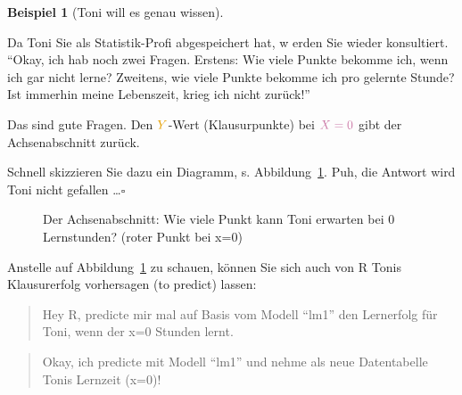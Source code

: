 \documentclass[
  letterpaper,
]{scrbook}
\theoremstyle{definition}
\newtheorem{example}{Beispiel}[chapter]
\theoremstyle{definition}
\theoremstyle{definition}
\theoremstyle{remark}
\begin{document}
\begin{example}[Toni will es genau
wissen]\protect\hypertarget{exm-noten5}{}\label{exm-noten5}

Da Toni Sie als Statistik-Profi abgespeichert hat, w erden Sie wieder
konsultiert. ``Okay, ich hab noch zwei Fragen. Erstens: Wie viele Punkte
bekomme ich, wenn ich gar nicht lerne? Zweitens, wie viele Punkte
bekomme ich pro gelernte Stunde? Ist immerhin meine Lebenszeit, krieg
ich nicht zurück!''

{Das sind gute Fragen. Den \(\color{ycol}{Y}\)-Wert (Klausurpunkte) bei
\(\color{xcol}{X}=0\) gibt der Achsenabschnitt zurück.}

Schnell skizzieren Sie dazu ein Diagramm, s. Abbildung~\ref{fig-beta0}.
Puh, die Antwort wird Toni nicht gefallen \ldots{}\(\square\)

\end{example}

\begin{figure}


\caption{\label{fig-beta0}Der Achsenabschnitt: Wie viele Punkt kann Toni
erwarten bei 0 Lernstunden? (roter Punkt bei x=0)}

\end{figure}%

Anstelle auf Abbildung~\ref{fig-beta0} zu schauen, können Sie sich auch
von R Tonis Klausurerfolg vorhersagen (to predict) lassen:

\begin{quote}
{} Hey R, predicte mir mal auf Basis vom Modell ``lm1''
den Lernerfolg für Toni, wenn der x=0 Stunden lernt.
\end{quote}

\begin{quote}
{} Okay, ich predicte mit Modell ``lm1'' und nehme als neue
Datentabelle Tonis Lernzeit (x=0)!
\end{quote}
\end{document}
